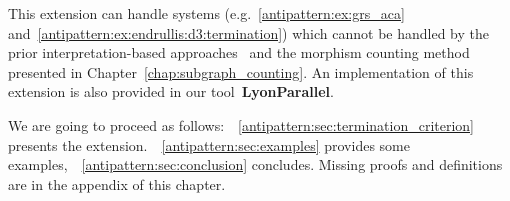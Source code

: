 This extension can handle systems (e.g.~\autoref{antipattern:ex:grs_aca} and~\autoref{antipattern:ex:endrullis:d3:termination}) which cannot be handled by the
prior interpretation-based approaches~\cite{zantema2014termination,bruggink2014termination,bruggink2015proving,endrullis2024generalized_arxiv_v2,overbeek2024termination_lmcs} and the morphism counting method presented in Chapter~\ref{chap:subgraph_counting}.
An implementation of this extension is also provided in our tool~\textbf{LyonParallel}.
  
We are going to proceed as follows:~\textsection~\ref{antipattern:sec:termination_criterion} presents the extension.~\textsection~\ref{antipattern:sec:examples} provides some examples,~\textsection~\ref{antipattern:sec:conclusion} concludes. Missing proofs and definitions are in the appendix of this chapter.